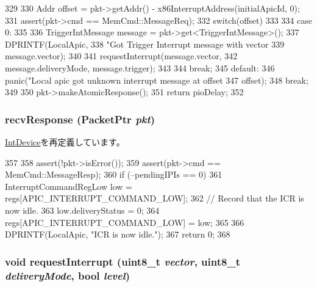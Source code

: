 \begin{DoxyCode}
329 {
330     Addr offset = pkt->getAddr() - x86InterruptAddress(initialApicId, 0);
331     assert(pkt->cmd == MemCmd::MessageReq);
332     switch(offset)
333     {
334       case 0:
335         {
336             TriggerIntMessage message = pkt->get<TriggerIntMessage>();
337             DPRINTF(LocalApic,
338                     "Got Trigger Interrupt message with vector %
339                     message.vector);
340 
341             requestInterrupt(message.vector,
342                     message.deliveryMode, message.trigger);
343         }
344         break;
345       default:
346         panic("Local apic got unknown interrupt message at offset %
347                 offset);
348         break;
349     }
350     pkt->makeAtomicResponse();
351     return pioDelay;
352 }
\end{DoxyCode}
\hypertarget{classX86ISA_1_1Interrupts_a96d1a00beed669f9145d55bc3675d99c}{
\subsubsection[{recvResponse}]{ recvResponse ({\bf PacketPtr} {\em pkt})}}
\label{classX86ISA_1_1Interrupts_a96d1a00beed669f9145d55bc3675d99c}


\hyperlink{classX86ISA_1_1IntDevice_ae473b2a0c55e73359b9643810869ca81}{IntDevice}を再定義しています。


\begin{DoxyCode}
357 {
358     assert(!pkt->isError());
359     assert(pkt->cmd == MemCmd::MessageResp);
360     if (--pendingIPIs == 0) {
361         InterruptCommandRegLow low = regs[APIC_INTERRUPT_COMMAND_LOW];
362         // Record that the ICR is now idle.
363         low.deliveryStatus = 0;
364         regs[APIC_INTERRUPT_COMMAND_LOW] = low;
365     }
366     DPRINTF(LocalApic, "ICR is now idle.\n");
367     return 0;
368 }
\end{DoxyCode}
\hypertarget{classX86ISA_1_1Interrupts_a19885e71b7427a0f49d5b006c1d7fc7f}{
\subsubsection[{requestInterrupt}]{\setlength{\rightskip}{0pt plus 5cm}void requestInterrupt (uint8\_\-t {\em vector}, \/  uint8\_\-t {\em deliveryMode}, \/  bool {\em level})}}
\label{classX86ISA_1_1Interrupts_a19885e71b7427a0f49d5b006c1d7fc7f}



